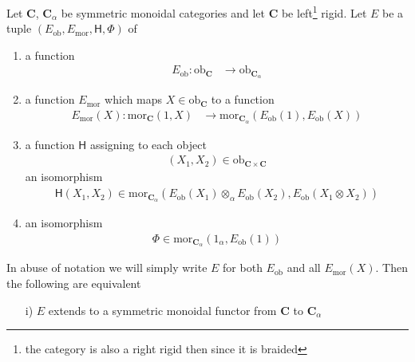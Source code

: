\begin{thm}
\label{THM:ACSMF}
Let $\mathbf{C}$, $\mathbf{C}_{\alpha}$ be symmetric monoidal categories and let $\mathbf{C}$ be left\footnote{the category is also a right rigid then since it is braided} rigid. Let $E$ be a tuple $(E_{\mathrm{ob}},E_{\mathrm{mor}},\mathsf{H},\Phi)$ of
\begin{enumerate}
\item
a function
\begin{align*}
  E_{\mathrm{ob}}
  \colon
  \mathrm{ob}_{\mathbf{C}}
  &\to
  \mathrm{ob}_{\mathbf{C}_{\alpha}}
\end{align*}

\item
a function $E_{\mathrm{mor}}$ which maps $X \in \mathrm{ob}_{\mathbf{C}}$ to a function
\begin{align*}
  E_{\mathrm{mor}}(X)
  \colon
  \mathrm{mor}_{\mathbf{C}}(1,X)
  &\to
  \mathrm{mor}_{\mathbf{C}_{\alpha}}
  \left(
    E_{\mathrm{ob}}(1)
    ,
    E_{\mathrm{ob}}(X)
  \right)
\end{align*}

\item
a function $\mathsf{H}$ assigning to each object
\begin{align*}
  (X_{1},X_{2})
  \in
  \mathrm{ob}_{\mathbf{C} \times \mathbf{C}}
\end{align*}
an isomorphism
\begin{align*}
  \mathsf{H}(X_{1},X_{2})
  \in
  \mathrm{mor}_{\mathbf{C}_{\alpha}}
  \left(
    E_{\mathrm{ob}}(X_{1})
    \otimes_{\alpha}
    E_{\mathrm{ob}}(X_{2})
    ,
    E_{\mathrm{ob}}(X_{1} \otimes X_{2})
  \right)
\end{align*}

\item
an isomorphism
\begin{align*}
  \Phi
  \in
  \mathrm{mor}_{\mathbf{C}_{\alpha}}
  \left(
    1_{\alpha}
    ,
    E_{\mathrm{ob}}(1)
  \right)
\end{align*}
\end{enumerate}
In abuse of notation we will simply write $E$ for both $E_{\mathrm{ob}}$ and all $E_{\mathrm{mor}}(X)$. Then the following are equivalent
\begin{enumerate}
\item[i)]
$E$ extends to a symmetric monoidal functor from $\mathbf{C}$ to $\mathbf{C}_{\alpha}$


\end{enumerate}
\end{thm}

